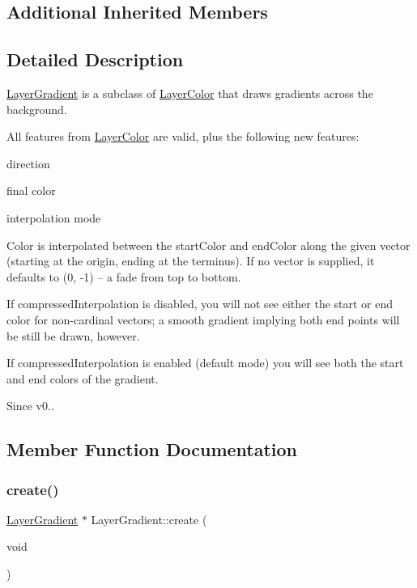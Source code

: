 \subsection*{Additional Inherited Members}


\subsection{Detailed Description}
\hyperlink{classLayerGradient}{Layer\+Gradient} is a subclass of \hyperlink{classLayerColor}{Layer\+Color} that draws gradients across the background. 

All features from \hyperlink{classLayerColor}{Layer\+Color} are valid, plus the following new features\+:
\begin{DoxyItemize}
\item direction
\item final color
\item interpolation mode
\end{DoxyItemize}

Color is interpolated between the start\+Color and end\+Color along the given vector (starting at the origin, ending at the terminus). If no vector is supplied, it defaults to (0, -\/1) -- a fade from top to bottom.

If \textquotesingle{}compressed\+Interpolation\textquotesingle{} is disabled, you will not see either the start or end color for non-\/cardinal vectors; a smooth gradient implying both end points will be still be drawn, however.

If \textquotesingle{} compressed\+Interpolation\textquotesingle{} is enabled (default mode) you will see both the start and end colors of the gradient.

\begin{DoxySince}{Since}
v0.. 
\end{DoxySince}


\subsection{Member Function Documentation}
\mbox{\label{classLayerGradient_a17fe9428e4f59c33f8e6eb8f8a97a5e9}} 
\subsubsection{\texorpdfstring{create()}{create()}\hspace{0.1cm}{\footnotesize\ttfamily [1/6]}}
{\footnotesize\ttfamily \hyperlink{classLayerGradient}{Layer\+Gradient} $\ast$ Layer\+Gradient\+::create (\begin{DoxyParamCaption}\item[{void}]{ }\end{DoxyParamCaption})\hspace{0.3cm}{\ttfamily [static]}}

